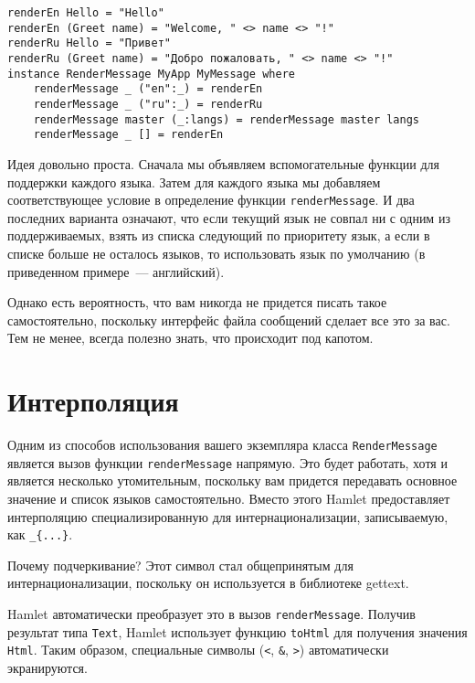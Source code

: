 \begin{lstlisting}
renderEn Hello = "Hello"
renderEn (Greet name) = "Welcome, " <> name <> "!"
renderRu Hello = "Привет"
renderRu (Greet name) = "Добро пожаловать, " <> name <> "!"
instance RenderMessage MyApp MyMessage where
    renderMessage _ ("en":_) = renderEn
    renderMessage _ ("ru":_) = renderRu
    renderMessage master (_:langs) = renderMessage master langs
    renderMessage _ [] = renderEn
\end{lstlisting}

Идея довольно проста. Сначала мы объявляем вспомогательные функции для поддержки каждого языка. Затем для каждого языка мы добавляем соответствующее условие в определение функции \lstinline'renderMessage'. И два последних варианта означают, что если текущий язык не совпал ни с одним из поддерживаемых, взять из списка следующий по приоритету язык, а если в списке больше не осталось языков, то использовать язык по умолчанию (в приведенном примере~--- английский).

Однако есть вероятность, что вам никогда не придется писать такое самостоятельно, поскольку интерфейс файла сообщений сделает все это за вас. Тем не менее, всегда полезно знать, что происходит под капотом.

\section{Интерполяция} %

Одним из способов использования вашего экземпляра класса \lstinline'RenderMessage' является вызов функции \lstinline'renderMessage' напрямую. Это будет работать, хотя и является несколько утомительным, поскольку вам придется передавать основное значение и список языков самостоятельно. Вместо этого Hamlet предоставляет интерполяцию специализированную для интернационализации, записываемую, как \lstinline'_{...}'.

\begin{remark}
Почему подчеркивание? Этот символ стал общепринятым для интернационализации, поскольку он используется в библиотеке gettext.
\end{remark}

Hamlet автоматически преобразует это в вызов \lstinline'renderMessage'. Получив результат типа \lstinline'Text', Hamlet использует функцию \lstinline'toHtml' для получения значения \lstinline'Html'. Таким образом, специальные символы (\verb'<', \verb'&', \verb'>') автоматически экранируются.

